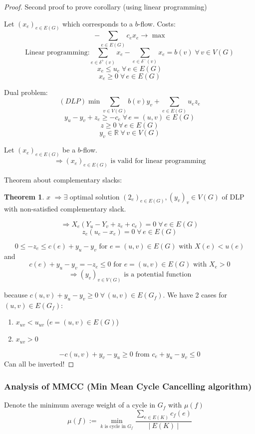 \documentclass[a4paper]{article}
\theoremstyle{definition}
\newtheorem{theorem}{Theorem}
\newcommand{\card}[1]{\left|\:\!#1\:\!\right|}
\newcommand{\fall}{\;\forall\,}
\begin{document}
\begin{proof}
  Second proof to prove corollary (using linear programming)

  Let $(x_e)_{e \in E(G)}$ which corresponds to a $b$-flow. Costs:
  \[
    -\sum_{e \in E(G)} c_e x_e \rightarrow \text{ max}
  \] \[
    \text{Linear programming:}
      \sum_{e \in \delta^+(v)} x_e - \sum_{e \in \delta^-(v)} x_e = b(v) \fall v \in V(G)
  \] \[
    x_e \leq u_e \fall e \in E(G)
  \] \[
    x_e \geq 0 \fall e \in E(G)
  \]

  Dual problem:
  \[
    (DLP) \min{\sum_{v \in V(G)} b(v) y_v + \sum_{e \in E(G)} u_e z_e}
  \] \[
    y_u - y_v + z_e \geq - c_e \fall e = (u,v) \in E(G)
  \] \[
    z \geq 0 \fall e \in E(G)
  \] \[
    y_v \in \mathbb{R} \fall v \in V(G)
  \]

  Let $(x_e)_{e \in E(G)}$ be a $b$-flow.
  \[ \Rightarrow (x_e)_{e \in E(G)} \text{ is valid for linear programming} \]

  Theorem about complementary slacks:
  \begin{theorem}
    $x$  $\Rightarrow \exists$ optimal solution $(2_e)_{e \in E(G)}, (y_v)_v \in V(G)$
    of DLP with non-satisfied complementary slack.
  \end{theorem}

  \[
    \Rightarrow X_e(Y_u - Y_v + z_e + c_e) = 0 \fall e \in E(G)
  \] \[
    z_e (u_e - x_e) = 0 \fall e \in E(G)
  \]

  \[
    0 \leq -z_e \leq c(e) + y_u - y_v \text{ for } e = (u,v) \in E(G) \text{ with } X(e) < u(e)
  \] and \[
    c(e) + y_u - y_v = -z_e \leq 0 \text{ for } e = (u,v) \in E(G) \text{ with } X_e > 0
  \] \[
    \Rightarrow (y_v)_{v \in V(G)} \text{ is a potential function}
  \]

  because $c(u,v) + y_u - y_v \geq 0 \fall (u,v) \in E(G_f)$.
  We have 2 cases for $(u,v) \in E(G_f)$:
  \begin{enumerate}
    \item $x_{uv} < u_{uv}$ ($e = (u,v) \in E(G)$)
    \item $x_{uv} > 0$
  \end{enumerate}

  \[
    -c(u,v) + y_v - y_u \geq 0 \text{ from } c_e + y_u - y_v \leq 0
  \]
  Can all be inverted!
\end{proof}

\subsubsection[Analysis of MMCC]{Analysis of MMCC (Min Mean Cycle Cancelling algorithm)}
%
Denote the minimum average weight of a cycle in $G_f$ with $\mu(f)$
\[
  \mu(f) := \min_{k \text{ is cycle in } G_f} \frac{\sum_{e \in E(K)} c_f(e)}{\card{E(K)}}
\]
\end{document}

